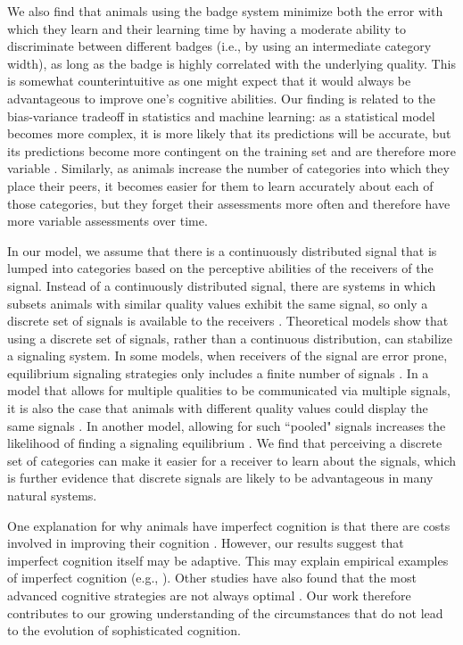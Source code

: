We also find that animals using the badge system minimize both the error with which they learn and their learning time by having a moderate ability to discriminate between different badges (i.e., by using an intermediate category width), as long as the badge is highly correlated with the underlying quality. This is somewhat counterintuitive as one might expect that it would always be advantageous to improve one's cognitive abilities. Our finding is related to the bias-variance tradeoff in statistics and machine learning: as a statistical model becomes more complex, it is more likely that its predictions will be accurate, but its predictions become more contingent on the training set and are therefore more variable \citep{Domingos:2000cr,Briscoe:2011nx}. Similarly, as animals increase the number of categories into which they place their peers, it becomes easier for them to learn accurately about each of those categories, but they forget their assessments more often and therefore have more variable assessments over time. %

In our model, we assume that there is a continuously distributed signal that is lumped into categories based on the perceptive abilities of the receivers of the signal. Instead of a continuously distributed signal, there are systems in which subsets animals with similar quality values exhibit the same signal, so only a discrete set of signals is available to the receivers \citep{Johnstone:1994uq}. Theoretical models show that using a discrete set of signals, rather than a continuous distribution, can stabilize a signaling system. In some models, when receivers of the signal are error prone, equilibrium signaling strategies only includes a finite number of signals \citep{Grafen:1993kx,Johnstone:1994uq}. In a model that allows for multiple qualities to be communicated via multiple signals, it is also the case that animals with different quality values could display the same signals \citep{Johnstone:1995vn}. In another model, allowing for such ``pooled" signals increases the likelihood of finding a signaling equilibrium \citep{Lachmann:1998fk}. We find that perceiving a discrete set of categories can make it easier for a receiver to learn about the signals, which is further evidence that discrete signals are likely to be advantageous in many natural systems.


One explanation for why animals have imperfect cognition is that there are costs involved in improving their cognition \citep{Dunbar:1992ys,Laughlin:1998ly,Laughlin:2001qf,Gavrilets:2006fk,MacIver:2010ve}. However, our results suggest that imperfect cognition itself may be adaptive. This may explain empirical examples of imperfect cognition (e.g., \citep{Kikuchi:2010ys}).
Other studies have also found that the most advanced cognitive strategies are not always optimal \citep{Stephens:1991fk,Kerr:2003vn,Dunlap:2009vn}. Our work therefore contributes to our growing understanding of the circumstances that do not lead to the evolution of sophisticated cognition.

